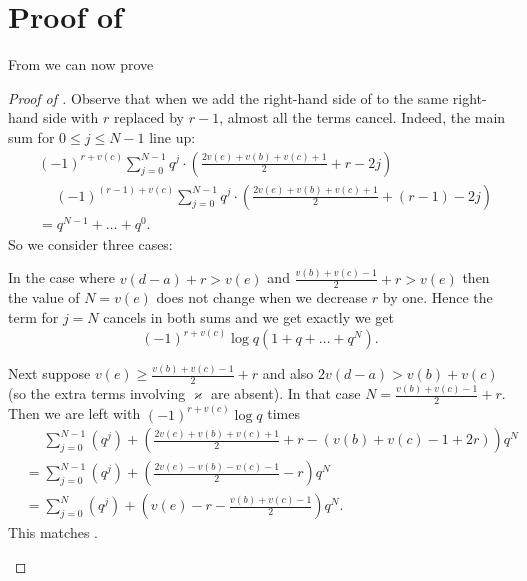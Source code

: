 \section{Proof of }
From  we can now prove 
\semiliecombo*
\begin{proof}[Proof of ]
Observe that when we add the right-hand side of 
to the same right-hand side with $r$ replaced by $r-1$, almost all the terms cancel.
Indeed, the main sum for $0 \le j \le N-1$ line up:
\begin{align*}
  &(-1)^{r+v(c)} \sum_{j=0}^{N-1} q^j \cdot \left( \frac{2v(e)+v(b)+v(c)+1}{2} + r - 2j \right) \\
  &\phantom+
  (-1)^{(r-1)+v(c)} \sum_{j=0}^{N-1} q^j \cdot \left( \frac{2v(e)+v(b)+v(c)+1}{2} + (r-1) - 2j \right) \\
  &= q^{N-1} + \dots + q^0.
\end{align*}
So we consider three cases:
\begin{itemize}
\ii In the case where $v(d-a)+r > v(e)$
and $\frac{v(b)+v(c)-1}{2} + r > v(e)$
then the value of $N = v(e)$ does not change when we decrease $r$ by one.
Hence the term for $j = N$ cancels in both sums and we get exactly
we get \[ (-1)^{r+v(c)} \log q (1 + q + \dots + q^N). \]

\ii Next suppose $v(e) \ge \frac{v(b)+v(c)-1}{2} + r$
and also $2v(d-a) > v(b) + v(c)$ (so the extra terms involving $\varkappa$ are absent).
In that case $N = \frac{v(b) + v(c) - 1}{2} + r$.
Then we are left with $(-1)^{r+v(c)} \log q$ times
\begin{align*}
  &\phantom= \sum_{j=0}^{N-1} (q^j) + \left( \frac{2v(e)+v(b)+v(c)+1}{2} + r - (v(b)+v(c)-1+2r) \right) q^N \\
  &= \sum_{j=0}^{N-1} (q^j) + \left( \frac{2v(e)-v(b)-v(c)-1}{2} - r \right) q^N \\
  &= \sum_{j=0}^{N} (q^j) + \left( v(e) - r - \frac{v(b)+v(c)-1}{2} \right) q^N.
\end{align*}
This matches .


\end{itemize}
\end{proof}
